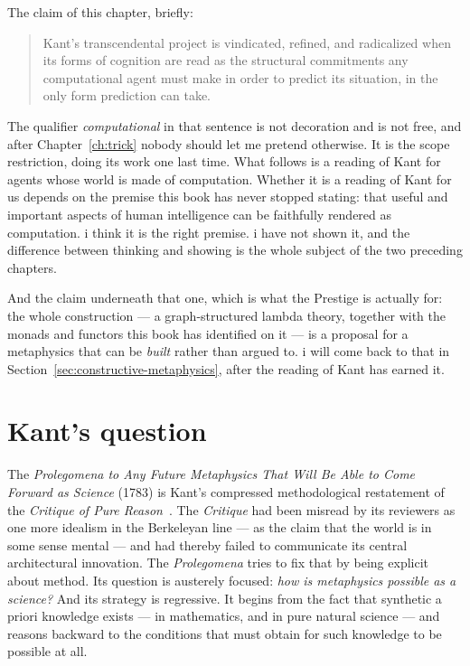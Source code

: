 The claim of this chapter, briefly:

\begin{quote}
Kant's transcendental project is vindicated, refined, and
radicalized when its forms of cognition are read as the structural
commitments any computational agent must make in order to predict
its situation, in the only form prediction can take.
\end{quote}

\noindent
The qualifier \emph{computational} in that sentence is not
decoration and is not free, and after Chapter~\ref{ch:trick} nobody
should let me pretend otherwise.
It is the scope restriction, doing its work one last time.
What follows is a reading of Kant for agents whose world is made of
computation.
Whether it is a reading of Kant for us depends on the premise this
book has never stopped stating: that useful and important aspects
of human intelligence can be faithfully rendered as computation.
i think it is the right premise.
i have not shown it, and the difference between thinking and
showing is the whole subject of the two preceding chapters.

\noindent
And the claim underneath that one, which is what the Prestige is
actually for: the whole construction --- a graph-structured lambda
theory, together with the monads and functors this book has
identified on it --- is a proposal for a metaphysics that can be
\emph{built} rather than argued to.
i will come back to that in Section~\ref{sec:constructive-metaphysics},
after the reading of Kant has earned it.

\section{Kant's question}
\label{sec:kant-recap}

The \emph{Prolegomena to Any Future Metaphysics That Will Be Able
to Come Forward as Science} (1783) is Kant's compressed
methodological restatement of the \emph{Critique of Pure
Reason}~\cite{Kant1783,Kant1781}.
The \emph{Critique} had been misread by its reviewers as one more
idealism in the Berkeleyan line --- as the claim that the world is
in some sense mental --- and had thereby failed to communicate its
central architectural innovation.
The \emph{Prolegomena} tries to fix that by being explicit about
method.
Its question is austerely focused: \emph{how is metaphysics
possible as a science?}
And its strategy is regressive.
It begins from the fact that synthetic a priori knowledge exists
--- in mathematics, and in pure natural science --- and reasons
backward to the conditions that must obtain for such knowledge to
be possible at all.


